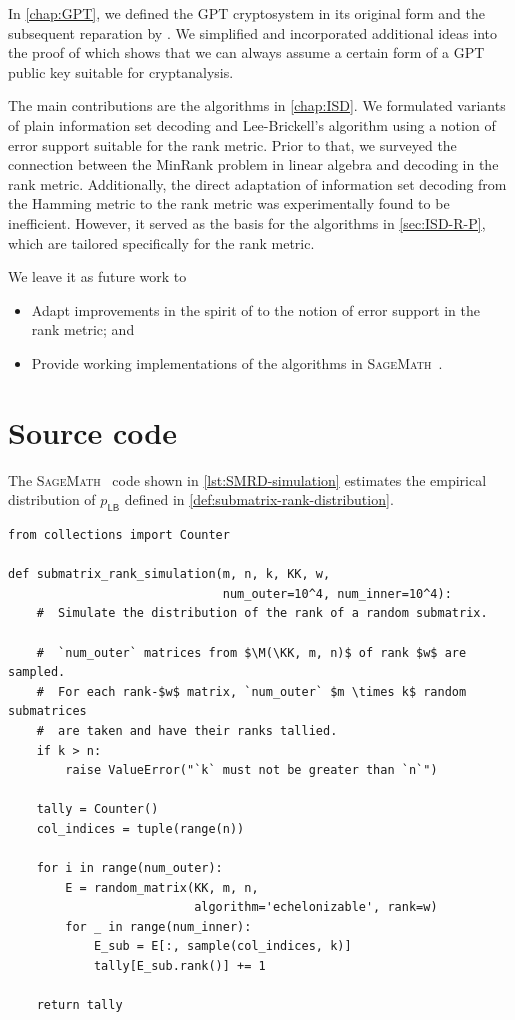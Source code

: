\documentclass[version=last, paper=A4, parskip=half, oneside]{scrbook}
\theoremstyle{plain}
\theoremstyle{definition}
\theoremstyle{remark}
\newcommand*{\M}{\ensuremath{\mathcal{M}}}
\newcommand*{\KK}{\ensuremath{\mathbb{K}}}
\newcommand*{\FF}{\ensuremath{\mathbb{F}}}
\newcommand*{\LB}{\ensuremath{\mathsf{LB}}}
\begin{document}
In \cref{chap:GPT}, we defined the GPT cryptosystem in its original form and
the subsequent reparation by \textcite{GO01}.  We simplified and incorporated
additional ideas into the proof of \textcite{Ksh07} which shows that we can
always assume a certain form of a GPT public key suitable for cryptanalysis.

The main contributions are the algorithms in \cref{chap:ISD}.  We formulated
variants of plain information set decoding and Lee\--Brickell's algorithm using
a notion of error support suitable for the rank metric.  Prior to that, we
surveyed the connection between the MinRank problem in linear algebra and
decoding in the rank metric.  Additionally, the direct adaptation of
information set decoding from the Hamming metric to the rank metric was
experimentally found to be inefficient.  However, it served as the basis for
the algorithms in \cref{sec:ISD-R-P}, which are tailored specifically for the
rank metric.

We leave it as future work to
\begin{itemize}
\item Adapt improvements in the spirit of \textcite{Ste89, Dum96} to the notion
  of error support in the rank metric; and
\item Provide working implementations of the algorithms in
  \textsc{SageMath}~\cite{SageMath}.
\end{itemize}

\appendix\chapter{Source code}

The \textsc{SageMath}~\cite{SageMath} code shown in \cref{lst:SMRD-simulation}
estimates the empirical distribution of \(p_{\LB}\) defined in
\cref{def:submatrix-rank-distribution}.

\begin{listing}[h]
\begin{verbatim}
from collections import Counter

def submatrix_rank_simulation(m, n, k, KK, w,
                              num_outer=10^4, num_inner=10^4):
    #  Simulate the distribution of the rank of a random submatrix.

    #  `num_outer` matrices from $\M(\KK, m, n)$ of rank $w$ are sampled.
    #  For each rank-$w$ matrix, `num_outer` $m \times k$ random submatrices
    #  are taken and have their ranks tallied.
    if k > n:
        raise ValueError("`k` must not be greater than `n`")

    tally = Counter()
    col_indices = tuple(range(n))

    for i in range(num_outer):
        E = random_matrix(KK, m, n,
                          algorithm='echelonizable', rank=w)
        for _ in range(num_inner):
            E_sub = E[:, sample(col_indices, k)]
            tally[E_sub.rank()] += 1

    return tally
\end{verbatim}
\captionbelow{Estimating \(p_{\LB}(p; 32, 32, 16, \FF_2, 8)\)
  empirically}\label{lst:SMRD-simulation}
\end{listing}

\backmatter%
\printbibliography{}
\end{document}

